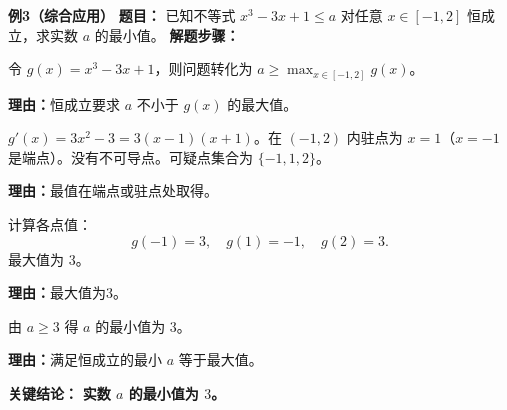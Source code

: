 \begin{examplebox}
	\medskip
	\textbf{\textcolor{CExample}{例3（综合应用）}}
	\textbf{\textcolor{CExample}{题目：}}
	已知不等式 $x^3-3x+1\le a$ 对任意 $x\in[-1,2]$ 恒成立，求实数 $a$ 的最小值。
	\textbf{\textcolor{CExample}{解题步骤：}}
	\begin{description}[style=nextline, leftmargin=2.8em, labelsep=0.5em, itemsep=0.45em]
		\item[\textbf{第一步（构造函数）：}]
			令 $g(x)=x^3-3x+1$，则问题转化为 $a\ge \max_{x\in[-1,2]} g(x)$。
			\par\textbf{理由：}恒成立要求 $a$ 不小于 $g(x)$ 的最大值。
		\item[\textbf{第二步（求可疑点）：}]
			$g'(x)=3x^2-3=3(x-1)(x+1)$。在 $(-1,2)$ 内驻点为 $x=1$（$x=-1$ 是端点）。没有不可导点。可疑点集合为 $\{-1,1,2\}$。
			\par\textbf{理由：}最值在端点或驻点处取得。
		\item[\textbf{第三步（计算并比较）：}]
			计算各点值：
			\[
				g(-1)=3,\quad g(1)=-1,\quad g(2)=3.
			\]
			最大值为 $3$。
			\par\textbf{理由：}最大值为3。
		\item[\textbf{第四步（得参数范围）：}]
			由 $a\ge3$ 得 $a$ 的最小值为 $3$。
			\par\textbf{理由：}满足恒成立的最小 $a$ 等于最大值。
	\end{description}
	\textbf{\textcolor{CExample}{关键结论：}}
	\textbf{实数 $a$ 的最小值为 $3$。}
\end{examplebox}
